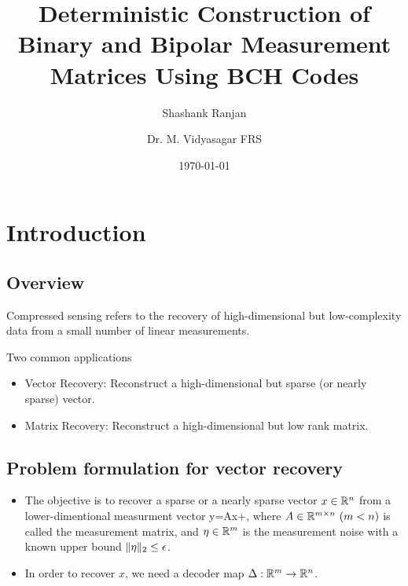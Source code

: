 \documentclass{beamer}
\def\bfr{\begin{frame}}
\begin{document}
	\title
	{  
		Deterministic Construction of Binary and Bipolar
		Measurement Matrices Using BCH Codes
	}
	\author[S. Ranjan, M. Vidyasagar FRS]{Shashank Ranjan \and Dr. M. Vidyasagar FRS }
	\date{\today}
	
	\maketitle
	
	
	


\section{Introduction}
\subsection{Overview}
\bfr

Compressed sensing refers to the recovery of high-dimensional but
low-complexity data from a small number of linear measurements.

Two common applications

\begin{itemize}
	\item Vector Recovery: Reconstruct a high-dimensional but sparse
	(or nearly sparse) vector.
	\item Matrix Recovery: Reconstruct a high-dimensional but low rank
	matrix.
\end{itemize}


\end{frame}

\subsection{Problem formulation for vector recovery}
\bfr
\begin{itemize}
\item The objective is to recover a sparse or a nearly sparse vector $x \in {\mathbb R}^n$ 
from a lower-dimentional measurment vector
\bd
y=Ax+\eta ,
\ed 
where $A\in\Rmn \ (m<n)$ is called the measurement matrix,
and $\eta\in{\mathbb R}^m$ is the measurement noise with 
a known upper bound $\Vert \eta \Vert_2\leq \epsilon$.
\item In order to recover $x$, we need a decoder map 
$\Delta : {\mathbb R}^{m}\rightarrow {\mathbb R}^{n}$.
\end{itemize}
\end{frame}
\end{document}
